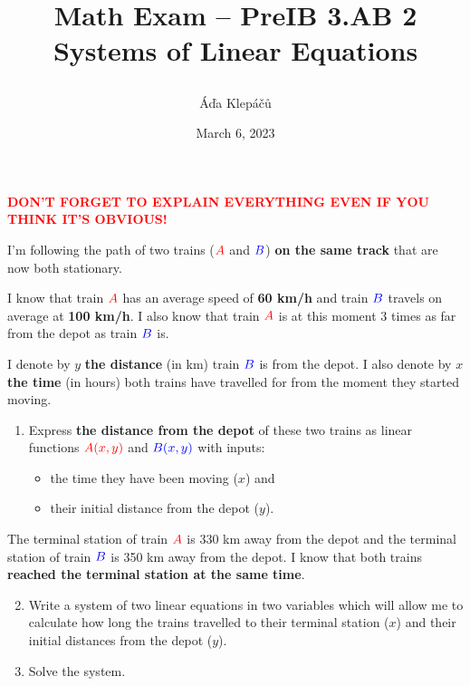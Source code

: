 \documentclass[a4paper,11pt]{article}
\title{\Huge\textsf{Math Exam -- PreIB 3.AB 2}\\
 \Large\textsf{Systems of Linear Equations}
 \author{Áďa Klepáčů}
 \date{March 6, 2023}
}
\newcommand{\tr}{\textcolor{red}}
\newcommand{\tb}{\textcolor{blue}}
\begin{document}
\maketitle
\thispagestyle{fancy}

\begin{center}
 \textbf{\tr{DON'T FORGET TO EXPLAIN EVERYTHING EVEN IF YOU THINK IT'S
 OBVIOUS!}}
\end{center}

I'm following the path of two trains ($\tr{A}$ and $\tb{B}$) \textbf{on the same
track} that are now both stationary.

I know that train $\tr{A}$ has an average speed of \textbf{60 km/h} and train
$\tb{B}$ travels on average at \textbf{100 km/h}. I also know that train
$\tr{A}$ is at this moment 3 times as far from the depot as train $\tb{B}$ is.

I denote by $y$ \textbf{the distance} (in km) train $\tb{B}$ is from the depot.
I also denote by $x$ \textbf{the time} (in hours) both trains have travelled for
from the moment they started moving.

\begin{enumerate}[label=(\alph*),topsep=0pt]
 \item Express \textbf{the distance from the depot} of these two trains as
  linear functions $\tr{A(x,y)}$ and $\tb{B(x,y)}$ with inputs: 
  \begin{itemize}[topsep=0pt]
   \item the time they have been moving ($x$) and
   \item their initial distance from the depot ($y$).
  \end{itemize}
\end{enumerate}
\newpage

The terminal station of train $\tr{A}$ is 330 km away from the depot and the
terminal station of train $\tb{B}$ is 350 km away from the depot. I know that
both trains \textbf{reached the terminal station at the same time}.
\begin{enumerate}[label=(\alph*),topsep=0pt]
 \setcounter{enumi}{1}
 \item Write a system of two linear equations in two variables which will allow
  me to calculate how long the trains travelled to their terminal station ($x$)
  and their initial distances from the depot ($y$).
 \item Solve the system.
\end{enumerate}

\newpage
\end{document}
